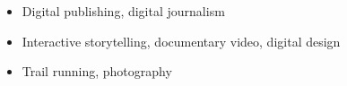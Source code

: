 \documentclass[a4paper,12pt]{memoir} %
\begin{document}




\begin{itemize}
	\item Digital publishing, digital journalism 
	\item Interactive storytelling, documentary video, digital design
	\item Trail running, photography
\end{itemize}

\Sep %

\end{document}
